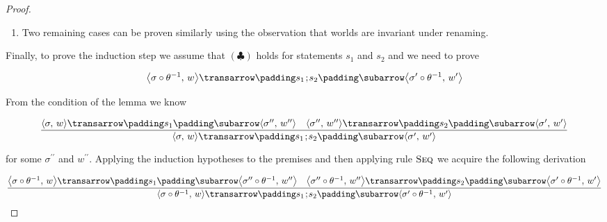\begin{proof}
\begin{enumerate}
    \[
    \left\{\begin{array}{rcl}
                                                                                         \sembr{e}^\ph_\mathscr{E}\,\sigma&,&y=\theta\,(x)\\
                                                                                         (\sigma\circ\theta^{-1})\,y&,&y\ne\theta\,(x)
                                                                                       \end{array}\right.=
   \left\{\begin{array}{rcl}
   \sembr{e}^\ph_\mathscr{E}\,\sigma&,&\theta^{-1}\,(y)=x\\
   (\sigma\,(\theta^{-1}\,(y))&,&\theta^{-1}\,(y)\ne x
    \end{array}\right.=(\sigma[x\gets\sembr{e}^\ph_\mathscr{E}])\,(\theta^{-1}\,(y))
    \]

    Thus, $\sigma^\prime=\sigma[x\gets\sembr{e}^\ph_\mathscr{E}]\circ\theta^{-1}$ which completes the proof for the assignment case.
    
  \item Two remaining cases can be proven similarly using the observation that worlds are invariant under renaming.
    
  \end{enumerate}
  
  Finally, to prove the induction step we assume that $(\clubsuit)$ holds for statements $s_1$ and $s_2$ and we need
  to prove

  \[
  \trans{\inbr{\sigma\circ\theta^{-1},\,w}}{s_1\llang{;}s_2}{\inbr{\sigma^\prime\circ\theta^{-1},\,w^\prime}}
  \]

  From the condition of the lemma we know

  \[
  \trule{\trans{\inbr{\sigma,\,w}}{s_1}{\inbr{\sigma^{\prime\prime},\,w^{\prime\prime}}}\quad\trans{\inbr{\sigma^{\prime\prime},\,w^{\prime\prime}}}{s_2}{\inbr{\sigma^\prime,\,w^\prime}}}
        {\trans{\inbr{\sigma,\,w}}{s_1\llang{;}s_2}{\inbr{\sigma^\prime,\,w^\prime}}}
  \]

  for some $\sigma^{\prime\prime}$ and $w^{\prime\prime}$. Applying the induction hypotheses to the premises and then applying rule $\textsc{Seq}$ we acquire the following
  derivation

  \[
  \trule{\trans{\inbr{\sigma\circ\theta^{-1},\,w}}{s_1}{\inbr{\sigma^{\prime\prime}\circ\theta^{-1},\,w^{\prime\prime}}}\quad\trans{\inbr{\sigma^{\prime\prime}\circ\theta^{-1},\,w^{\prime\prime}}}{s_2}{\inbr{\sigma^\prime\circ\theta^{-1},\,w^\prime}}}
        {\trans{\inbr{\sigma\circ\theta^{-1},\,w}}{s_1\llang{;}s_2}{\inbr{\sigma^\prime\circ\theta^{-1},\,w^\prime}}}
  \]


\end{proof}

